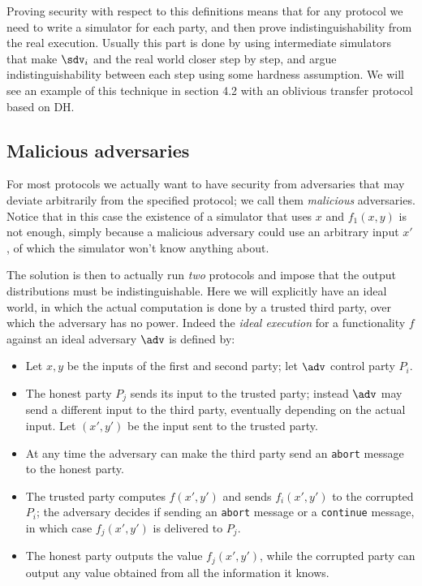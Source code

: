 Proving security with respect to this definitions means that for any protocol we need to write a simulator for each party, and then prove indistinguishability from the real execution. Usually this part is done by using intermediate simulators that make $\sdv_i$ and the real world closer step by step, and argue indistinguishability between each step using some hardness assumption. We will see an example of this technique in section 4.2 with an oblivious transfer protocol based on DH.

\subsection{Malicious adversaries}
For most protocols we actually want to have security from adversaries that may deviate arbitrarily from the specified protocol; we call them \emph{malicious} adversaries. Notice that in this case the existence of a simulator that uses $x$ and $f_1(x,y)$ is not enough, simply because a malicious adversary could use an arbitrary input $x'$, of which the simulator won't know anything about.

The solution is then to actually run \emph{two} protocols and impose that the output distributions must be indistinguishable. Here we will explicitly have an ideal world, in which the actual computation is done by a trusted third party, over which the adversary has no power. Indeed the \emph{ideal execution} for a functionality $f$ against an ideal adversary $\adv$ is defined by:
\begin{itemize}
    \item Let $x,y$ be the inputs of the first and second party; let $\adv$ control party $P_i$.
    \item The honest party $P_j$ sends its input to the trusted party; instead $\adv$ may send a different input to the third party, eventually depending on the actual input. Let $(x',y')$ be the input sent to the trusted party.
    \item At any time the adversary can make the third party send an \texttt{abort} message to the honest party.
    \item The trusted party computes $f(x',y')$ and sends $f_i(x',y')$ to the corrupted $P_i$; the adversary decides if sending an \texttt{abort} message or a \texttt{continue} message, in which case $f_j(x',y')$ is delivered to $P_j$.
    \item The honest party outputs the value $f_j(x',y')$, while the corrupted party can output any value obtained from all the information it knows.
\end{itemize}

